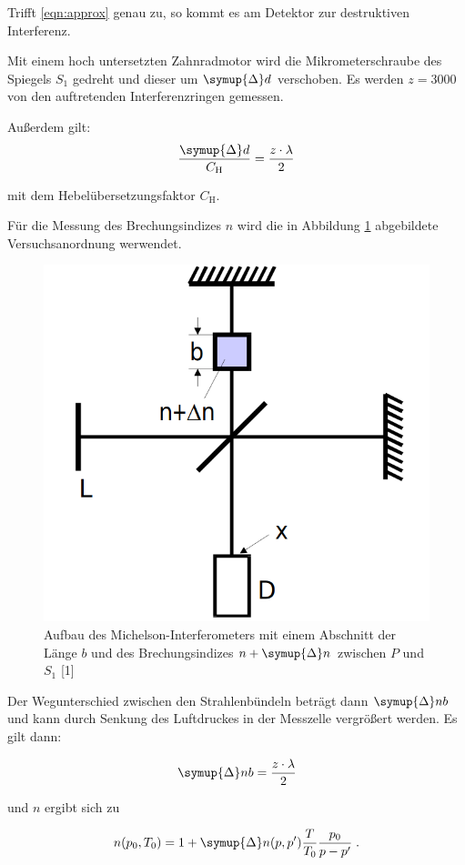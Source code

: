 Trifft \eqref{eqn:approx} genau zu, so kommt es am Detektor zur destruktiven Interferenz.


Mit einem hoch untersetzten Zahnradmotor wird die Mikrometerschraube des Spiegels $S_1$ gedreht und dieser
um $\symup{\Delta} d$ verschoben. Es werden $z = 3000$ von den auftretenden Interferenzringen gemessen.

Außerdem gilt: 
\begin{equation}
    \frac{\symup{\Delta}d}{C_\text{H}} = \frac{z \cdot \lambda}{2}
    \label{eqn:eins}
\end{equation}

mit dem Hebelübersetzungsfaktor $C_\text{H}$.

Für die Messung des Brechungsindizes $n$ wird die in Abbildung \ref{fig:bild2} abgebildete
Versuchsanordnung werwendet.

\begin{figure}
    \centering
    \includegraphics[scale = 0.2]{content/bild2.png}
    \caption{Aufbau des Michelson-Interferometers mit einem Abschnitt der Länge $b$ und des
    Brechungsindizes $n + \symup{\Delta}n$ zwischen $P$ und $S_1$ [1]}
    \label{fig:bild2}
  \end{figure}

  Der Wegunterschied zwischen den Strahlenbündeln beträgt dann $\symup{\Delta}nb$ und
  kann durch Senkung des Luftdruckes in der Messzelle vergrößert werden. Es gilt dann:

  \begin{equation}
    \symup{\Delta}nb = \frac{z \cdot \lambda}{2}
    \label{eqn:delta}
  \end{equation}

  und $n$ ergibt sich zu

  \begin{equation}
      n(p_0, T_0) = 1 + \symup{\Delta} n (p,p') \frac{T}{T_0} \frac{p_0}{p - p'} \; .
      \label{eqn:brech}
  \end{equation}


